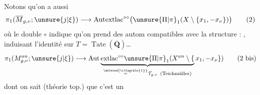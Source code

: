 Notons qu'on a aussi
\[
\pi_1(\overline M_{g,\nu};\unsure{j|\xi})\longrightarrow\operatorname{Autextlac}^{\circ\circ}\bigl(\unsure{\Pi|\pi}_1(X\setminus\{x_1,\mathbin{-}x_\nu\})\bigr)\tag{2}
\]
où le double $\circ$ indique qu'on prend des autom  compatibles avec la structure : ,  induisant l'identité sur $T=\operatorname{Tate}(\overline{\mathbf Q})$\ldots
{}
\[
\pi_1(M_{g,\nu}^{an};\unsure{j|\xi})\longrightarrow
\mathrm{Aut}\underbrace{\mathrm{extlac}^{\circ\circ}\unsure{\Pi|\pi}_1(X^{an}\setminus\{}_{\overset{\deleted{\illegible{1}}}{=}\mathcal T_{g,\nu}\ (\text{Teichmüller})}x_1,\mathbin{-}x_\nu\})\tag{2 bis}
\]
dont on sait (théorie top.) que c'est un
